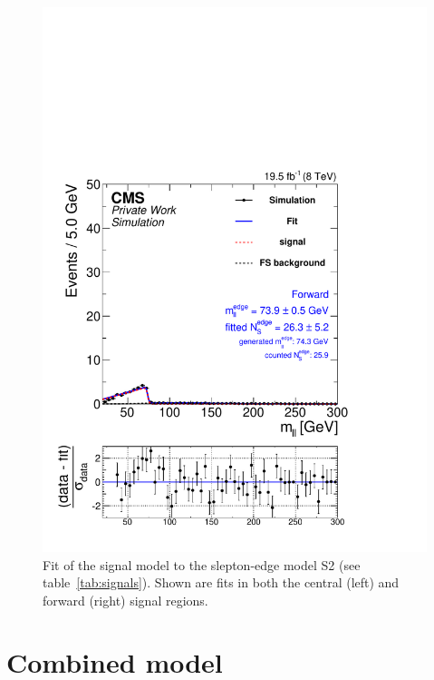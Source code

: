 \begin{figure}[hbp]
\begin{minipage}[t]{0.49\textwidth}
    \includegraphics[width=\textwidth]{plots/results/fit/mcFits/shapeIllustrationKTriangle_SignalInclusive_Combined_Full2012_KTriangle_MC_slepton_500_175_100_Forward.pdf}
  \end{minipage}
\caption{Fit of the signal model to the slepton-edge model S2 (see table~\ref{tab:signals}). Shown are fits in both the central (left) and forward (right) signal regions.}
  \label{fig:signalModel:slepton}
\end{figure}


\section{Combined model}

